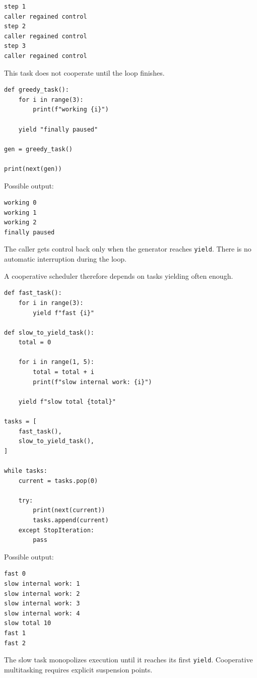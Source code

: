 \begin{verbatim}
step 1
caller regained control
step 2
caller regained control
step 3
caller regained control
\end{verbatim}

This task does not cooperate until the loop finishes.

\begin{verbatim}
def greedy_task():
    for i in range(3):
        print(f"working {i}")

    yield "finally paused"

gen = greedy_task()

print(next(gen))
\end{verbatim}

Possible output:

\begin{verbatim}
working 0
working 1
working 2
finally paused
\end{verbatim}

The caller gets control back only when the generator reaches \texttt{yield}. There is no automatic interruption during the loop.

A cooperative scheduler therefore depends on tasks yielding often enough.

\begin{verbatim}
def fast_task():
    for i in range(3):
        yield f"fast {i}"

def slow_to_yield_task():
    total = 0

    for i in range(1, 5):
        total = total + i
        print(f"slow internal work: {i}")

    yield f"slow total {total}"

tasks = [
    fast_task(),
    slow_to_yield_task(),
]

while tasks:
    current = tasks.pop(0)

    try:
        print(next(current))
        tasks.append(current)
    except StopIteration:
        pass
\end{verbatim}

Possible output:

\begin{verbatim}
fast 0
slow internal work: 1
slow internal work: 2
slow internal work: 3
slow internal work: 4
slow total 10
fast 1
fast 2
\end{verbatim}

The slow task monopolizes execution until it reaches its first \texttt{yield}. Cooperative multitasking requires explicit suspension points.

